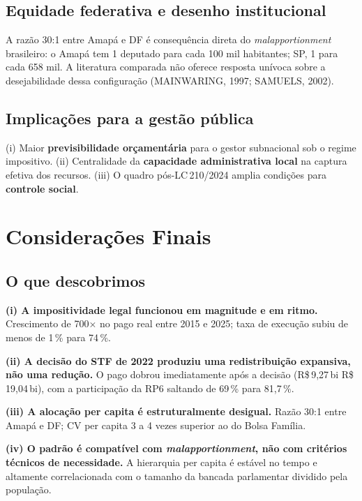 \documentclass[12pt,a4paper,oneside]{article}
\newcommand{\rs}{R\$\,}
\begin{document}
\subsection{Equidade federativa e desenho institucional}

A razão 30:1 entre Amapá e DF é consequência direta do
\textit{malapportionment} brasileiro: o Amapá tem 1 deputado para
cada 100 mil habitantes; SP, 1 para cada 658 mil. A literatura
comparada não oferece resposta unívoca sobre a desejabilidade dessa
configuração (MAINWARING, 1997; SAMUELS, 2002).

\subsection{Implicações para a gestão pública}

(i) Maior \textbf{previsibilidade orçamentária} para o gestor
subnacional sob o regime impositivo. (ii) Centralidade da
\textbf{capacidade administrativa local} na captura efetiva dos
recursos. (iii) O quadro pós-LC\,210/2024 amplia condições para
\textbf{controle social}.

\section{Considerações Finais}\label{sec:conclusao}

\subsection{O que descobrimos}

\textbf{(i) A impositividade legal funcionou em magnitude e em ritmo.}
Crescimento de 700$\times$ no pago real entre 2015 e 2025; taxa de
execução subiu de menos de 1\,\% para 74\,\%.

\textbf{(ii) A decisão do STF de 2022 produziu uma redistribuição
expansiva, não uma redução.} O pago dobrou imediatamente após a
decisão (\rs 9{,}27\,bi \textrightarrow{} \rs 19{,}04\,bi), com a
participação da RP6 saltando de 69\,\% para 81{,}7\,\%.

\textbf{(iii) A alocação per capita é estruturalmente desigual.}
Razão 30:1 entre Amapá e DF; CV per capita 3 a 4 vezes superior ao
do Bolsa Família.

\textbf{(iv) O padrão é compatível com \textit{malapportionment}, não
com critérios técnicos de necessidade.} A hierarquia per capita é
estável no tempo e altamente correlacionada com o tamanho da bancada
parlamentar dividido pela população.
\end{document}
